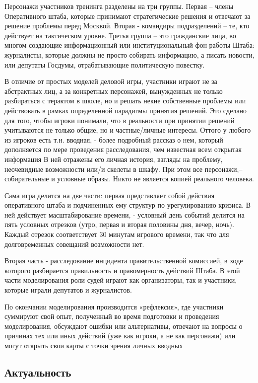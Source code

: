	Персонажи участников тренинга разделены на три группы. Первая –  члены Оперативного штаба, которые принимают стратегические решения и отвечают за решение проблемы перед Москвой. 
	Вторая - командиры подразделений – те, кто действует на тактическом уровне. 
	Третья группа – это гражданские лица, во многом создающие информационный или институциональный фон работы Штаба: журналисты, которые должны не просто собирать информацию, а писать новости, или депутаты Госдумы, отрабатывающие политическую повестку.
	
	В отличие от простых моделей деловой игры, участники играют не за абстрактных лиц, а за конкретных персонажей,  вынужденных не только разбираться с терактом в школе, но и решать некие собственные проблемы или действовать в рамках определенной парадигмы принятия решений. 
	Это сделано для того, чтобы игроки понимали, что в реальности при принятии решений учитываются не только общие, но и частные/личные интересы. 
	Оттого у любого из игроков есть т.н. вводная,  - более подробный рассказ о нем, который дополняется по мере проведения расследования, чем известная всем открытая информация
	В ней отражены его личная история,  взгляды на проблему,  неочевидные возможности или/и скелеты в шкафу. При этом все персонажи,– собирательные и условные образы.
	Никто не является копией реального человека.

	Сама игра  делится на две части: первая представляет собой действия оперативного штаба и подчиненных ему структур по урегулированию кризиса. 
	В ней действует масштабирование времени, - условный день событий делится на пять условных отрезков (утро, первая и вторая половины дня, вечер, ночь). 
	Каждый отрезок соответствует 30 минутам  игрового времени, так что для долговременных  совещаний возможности нет.
	
	Вторая  часть  - расследование инцидента правительственной комиссией, в ходе которого разбирается правильность и правомерность действий Штаба. 
	В этой части моделирования роли судей играют как организаторы, так и участники, которые играли депутатов и журналистов.
	
	По окончании моделирования производится «рефлексия», где участники суммируют свой опыт,  полученный во время подготовки и проведения моделирования, обсуждают ошибки или альтернативы, отвечают на вопросы о причинах тех или иных действий (уже как игроки, а не как персонажи) или могут открыть свои карты с точки зрения личных вводных \cite{1}
	
\subsection{Актуальность}

